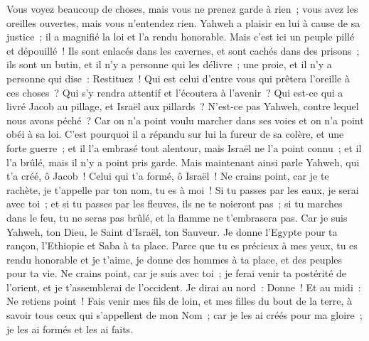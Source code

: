 \begin{multicols}{2}
Vous voyez beaucoup de choses, mais vous ne prenez garde à rien~; vous avez les oreilles ouvertes, mais vous n'entendez rien.
Yahweh a plaisir en lui à cause de sa justice~; il a magnifié la loi et l'a rendu honorable.
Mais c'est ici un peuple pillé et dépouillé~! Ils sont enlacés dans les cavernes, et sont cachés dans des prisons~; ils sont un butin, et il n'y a personne qui les délivre~; une proie, et il n'y a personne qui dise~: Restituez~!
Qui est celui d'entre vous qui prêtera l'oreille à ces choses~? Qui s'y rendra attentif et l'écoutera à l'avenir~?
Qui est-ce qui a livré Jacob au pillage, et Israël aux pillards~? N'est-ce pas Yahweh, contre lequel nous avons péché~? Car on n'a point voulu marcher dans ses voies et on n'a point obéi à sa loi.
C'est pourquoi il a répandu sur lui la fureur de sa colère, et une forte guerre~; et il l'a embrasé tout alentour, mais Israël ne l'a point connu~; et il l'a brûlé, mais il n'y a point pris garde.
\VerseOne{}Mais maintenant ainsi parle Yahweh, qui t'a créé, ô Jacob~! Celui qui t'a formé, ô Israël~! Ne crains point, car je te rachète, je t'appelle par ton nom, tu es à moi~!
Si tu passes par les eaux, je serai avec toi~; et si tu passes par les fleuves, ils ne te noieront pas~; si tu marches dans le feu, tu ne seras pas brûlé, et la flamme ne t'embrasera pas.
Car je suis Yahweh, ton Dieu, le Saint d'Israël, ton Sauveur. Je donne l'Egypte pour ta rançon, l'Ethiopie et Saba à ta place.
Parce que tu es précieux à mes yeux, tu es rendu honorable et je t'aime, je donne des hommes à ta place, et des peuples pour ta vie.
Ne crains point, car je suis avec toi~; je ferai venir ta postérité de l'orient, et je t'assemblerai de l'occident.
Je dirai au nord~: Donne~! Et au midi~: Ne retiens point~! Fais venir mes fils de loin, et mes filles du bout de la terre,
à savoir tous ceux qui s'appellent de mon Nom~; car je les ai créés pour ma gloire~; je les ai formés et les ai faits.

\end{multicols}
